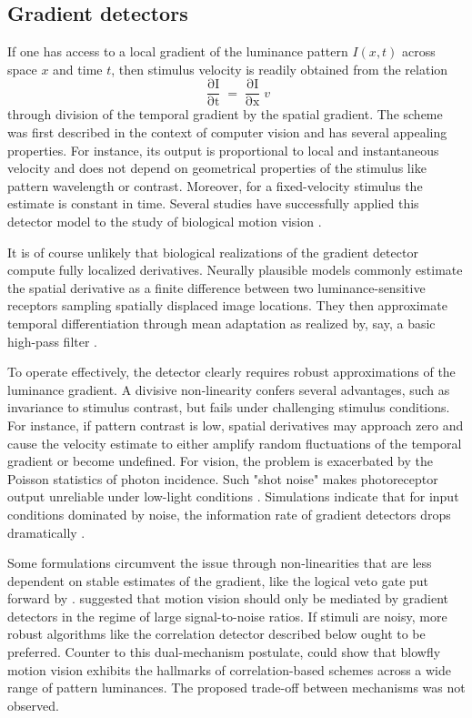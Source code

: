 \subsection{Gradient detectors}
If one has access to a local gradient of the luminance pattern $I(x,t)$ across space $x$ and time $t$, then stimulus velocity is readily obtained from the relation
\begin{equation}
    \frac{\mathop{\partial I}}{\mathop{\partial t}} = \frac{\mathop{\partial I}}{\mathop{\partial x}} v
\end{equation}
through division of the temporal gradient by the spatial gradient. The scheme was first described in the context of computer vision \citep{Limb:1975aa,Fennema:1979aa} and has several appealing properties. For instance, its output is proportional to local and instantaneous velocity and does not depend on geometrical properties of the stimulus like pattern wavelength or contrast. Moreover, for a fixed-velocity stimulus the estimate is constant in time. Several studies have successfully applied this detector model to the study of biological motion vision \citep{Hildreth:1987jt,Johnston:1995aa,Borst:2007gz}.

It is of course unlikely that biological realizations of the gradient detector compute fully localized derivatives. Neurally plausible models commonly estimate the spatial derivative as a finite difference between two luminance-sensitive receptors sampling spatially displaced image locations. They then approximate temporal differentiation through mean adaptation as realized by, say, a basic high-pass filter \citep{Srinivasasn:1990aa,Borst:2011bq}.

To operate effectively, the detector clearly requires robust approximations of the luminance gradient. A divisive non-linearity confers several advantages, such as invariance to stimulus contrast, but fails under challenging stimulus conditions. For instance, if pattern contrast is low, spatial derivatives may approach zero and cause the velocity estimate to either amplify random fluctuations of the temporal gradient or become undefined. For vision, the problem is exacerbated by the Poisson statistics of photon incidence. Such "shot noise" makes photoreceptor output unreliable under low-light conditions \citep{Laughlin:1996aa}. Simulations indicate that for input conditions dominated by noise, the information rate of gradient detectors drops dramatically \citep{Borst:2007gz}.

Some formulations circumvent the issue through non-linearities that are less dependent on stable estimates of the gradient, like the logical veto gate put forward by \citet{Marr:1981aa}. \citet{Potters:1994aa} suggested that motion vision should only be mediated by gradient detectors in the regime of large signal-to-noise ratios. If stimuli are noisy, more robust algorithms like the correlation detector described below ought to be preferred. Counter to this dual-mechanism postulate, \citet{Haag:2004bj} could show that blowfly motion vision exhibits the hallmarks of correlation-based schemes across a wide range of pattern luminances. The proposed trade-off between mechanisms was not observed.

